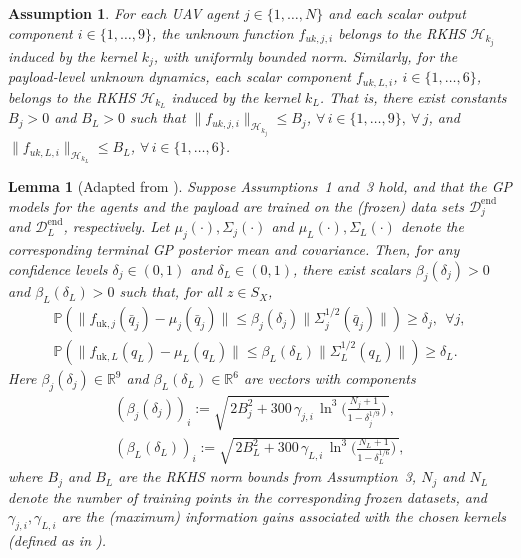 \documentclass[letterpaper, 10 pt, conference]{ieeeconf}  %
\newcommand{\0}{\matr{0}}
\newtheorem{assumption}{Assumption}
\newtheorem{lemma}{Lemma}
\begin{document}
\begin{assumption}
\label{ass:rkhs}
For each UAV agent $j\in\{1,\dots,N\}$ and each scalar output component $i\in\{1,\dots,9\}$,
the unknown function $f_{uk,j,i}$ belongs to the RKHS $\mathcal H_{k_j}$ induced by the kernel $k_j$,
with uniformly bounded norm.
Similarly, for the payload-level unknown dynamics, each scalar component $f_{uk,L,i}$, $i\in\{1,\dots,6\}$,
belongs to the RKHS $\mathcal H_{k_L}$ induced by the kernel $k_L$.
That is, there exist constants $B_j>0$ and $B_L>0$ such that $\|f_{uk,j,i}\|_{\mathcal H_{k_j}} \le B_j$, $\forall\, i\in\{1,\dots,9\},\ \forall\, j$, and $\|f_{uk,L,i}\|_{\mathcal H_{k_L}} \le B_L$, $\forall\, i\in\{1,\dots,6\}$.
\end{assumption}

\begin{lemma}[Adapted from \cite{Srinivas2012}]
\label{lem:gp_error_bound}
Suppose Assumptions~1 and~3 hold, and that the GP models for the agents and the payload
are trained on the (frozen) data sets $\mathcal{D}^{\mathrm{end}}_j$ and $\mathcal{D}^{\mathrm{end}}_L$, respectively.
Let $\mu_j(\cdot),\Sigma_j(\cdot)$ and $\mu_L(\cdot),\Sigma_L(\cdot)$ denote the corresponding terminal GP posterior mean and covariance.
Then, for any confidence levels $\delta_j\in(0,1)$ and $\delta_L\in(0,1)$, there exist scalars
$\beta_j(\delta_j)>0$ and $\beta_L(\delta_L)>0$ such that, for all $z\in S_X$,
\begin{align*}
\mathbb{P}\!\left(\|f_{\mathrm{uk},j}(\bar q_j)-\mu_j(\bar q_j)\|\le \beta_j(\delta_j)\|\Sigma_j^{1/2}(\bar q_j)\|\right)\ge \delta_j,\ \ \forall j,\\
\mathbb{P}\!\left(\|f_{\mathrm{uk},L}(q_L)-\mu_L(q_L)\|\le \beta_L(\delta_L)\|\Sigma_L^{1/2}(q_L)\|\right)\ge \delta_L.
\end{align*}
Here $\beta_j(\delta_j)\in\mathbb{R}^{9}$ and $\beta_L(\delta_L)\in\mathbb{R}^{6}$ are vectors with components
\begin{align}
(\beta_j(\delta_j))_i
:= \sqrt{\,2B_j^2 + 300\,\gamma_{j,i}\,
\ln^3\!\Big(\frac{N_j+1}{1-\delta_j^{1/9}}\Big)\,}, \label{eq:beta_agents}\\
(\beta_L(\delta_L))_i
:= \sqrt{\,2B_L^2 + 300\,\gamma_{L,i}\,
\ln^3\!\Big(\frac{N_L+1}{1-\delta_L^{1/6}}\Big)\,}, \label{eq:beta_payload}
\end{align}
where $B_j$ and $B_L$ are the RKHS norm bounds from Assumption~3, $N_j$ and $N_L$ denote the
number of training points in the corresponding frozen datasets, and
$\gamma_{j,i},\gamma_{L,i}$ are the (maximum) information gains associated with the chosen kernels
(defined as in \cite{Srinivas2012}).
\end{lemma}
\end{document}
